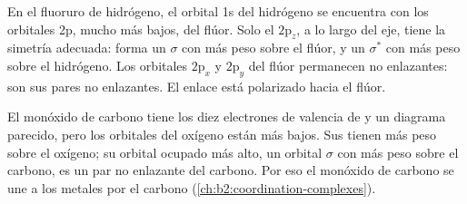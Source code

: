 En el fluoruro de hidrógeno, el orbital 1s del hidrógeno se encuentra con los orbitales 2p, mucho más bajos,
del flúor. Solo el $2\mathrm p_z$, a lo largo del eje, tiene la simetría adecuada: forma
un  $\sigma$ con más peso sobre el flúor, y un $\sigma^*$ con más peso sobre el
hidrógeno. Los orbitales $2\mathrm p_x$ y $2\mathrm p_y$ del flúor permanecen
no enlazantes: son sus pares no enlazantes. El enlace está polarizado hacia el flúor.

El monóxido de carbono tiene los diez electrones de valencia de  y un diagrama parecido,
pero los orbitales del oxígeno están más bajos. Sus  tienen más peso sobre el oxígeno;
su orbital ocupado más alto, un orbital $\sigma$ con más peso sobre el carbono, es un par no enlazante
del carbono. Por eso el monóxido de carbono se une a los metales por el carbono
(\cref{ch:b2:coordination-complexes}).

